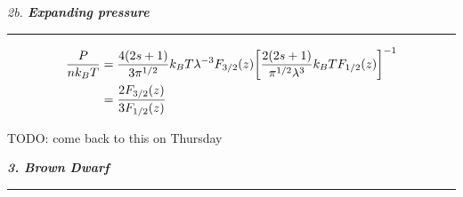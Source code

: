 \documentclass[12pt, letterpaper, twoside]{article}
\newcommand{\question}[1]{{\noindent \it #1}}
\newcommand{\answer}[1]{
    \par\noindent\rule{\textwidth}{0.4pt}#1\vspace{0.5cm}
}
\newcommand{\todo}[1]{{\color{red}\begin{center}TODO: #1\end{center}}}
\begin{document}
\question{2b. \textbf{Expanding pressure}}
\answer{
    \begin{align}
        \frac{P}{n k_B T} &= \frac{4(2s + 1)}{3 \pi^{1/2}} k_B T \lambda^{-3} F_{3/2}(z) \qty[\frac{2(2s + 1)}{\pi^{1/2} \lambda^3} k_B T F_{1/2}(z)]^{-1} \\
                          &= \frac{2 F_{3/2}(z)}{3 F_{1/2}(z)}
    \end{align}
    \todo{come back to this on Thursday}
}

\question{\textbf{3. Brown Dwarf}}

\answer{}
\end{document}
